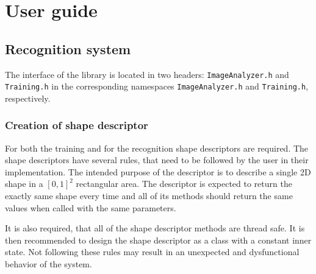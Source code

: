 \appendix
\chapter{User guide}
\section{Recognition system}
The interface of the library is located in two headers: \texttt{ImageAnalyzer.h} and \texttt{Training.h} in the corresponding namespaces \texttt{ImageAnalyzer.h} and \texttt{Training.h}, respectively. 

\subsection{Creation of shape descriptor}
For both the training and for the recognition shape descriptors are required. The shape descriptors have several rules, that need to be followed by the user in their implementation. The intended purpose of the descriptor is to describe a single 2D shape in a $[0,1]^2$ rectangular area. The descriptor is expected to return the exactly same shape every time and all of its methods should return the same values when called with the same parameters. 

It is also required, that all of the shape descriptor methods are thread safe. It is then recommended to design the shape descriptor as a class with a constant inner state. Not following these rules may result in an unexpected and dysfunctional behavior of the system. 

